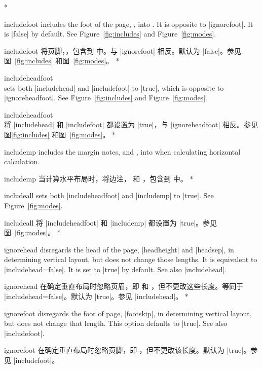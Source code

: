 \begin{Options}
\begin{paracol}{2}
\switchcolumn[0]*
\item[includefoot] includes the foot of the page, ,
   into . It is opposite to |ignorefoot|.
   It is |false| by default. See Figure~\ref{fig:includes} and
   Figure~\ref{fig:modes}.
   \switchcolumn
   \item[includefoot] 将页脚，，包含到  中。与 |ignorefoot| 相反。默认为 |false|。参见图~\ref{fig:includes} 和图~\ref{fig:modes}。
   \switchcolumn[0]*
\item[includeheadfoot]~\\ 
   sets both |includehead| and |includefoot| to |true|, which is opposite
   to |ignoreheadfoot|. See Figure~\ref{fig:includes} and
   Figure~\ref{fig:modes}.
\switchcolumn
\item[includeheadfoot]~\\ 
将 |includehead| 和 |includefoot| 都设置为 |true|，与 |ignoreheadfoot| 相反。参见图\ref{fig:includes} 和图~\ref{fig:modes}。
\switchcolumn[0]*
\item[includemp] includes the margin notes,  
   and , into  when calculating horizontal
   calculation.
   \switchcolumn
   \item[includemp] 当计算水平布局时，将边注， 和 ，包含到  中。
\switchcolumn[0]*
\item[includeall] sets both |includeheadfoot| and |includemp| to
   |true|. See Figure~\ref{fig:modes}.
   \switchcolumn
   \item[includeall] 将 |includeheadfoot| 和 |includemp| 都设置为 |true|。参见图~\ref{fig:modes}。
\switchcolumn[0]*
\item[ignorehead] disregards the head of the page,
   |headheight| and |headsep|, in determining vertical layout, but does not
   change those lengths. It is equivalent to |includehead=false|. It is set
   to |true| by default. See also |includehead|.
   \switchcolumn
   \item[ignorehead] 在确定垂直布局时忽略页眉，即  和 ，但不更改这些长度。等同于 |includehead=false|。默认为 |true|。参见 |includehead|。
\switchcolumn[0]*
\item[ignorefoot] disregards the foot of page, |footskip|,
   in determining vertical layout, but does not change that length.
   This option defaults to |true|. See also |includefoot|.
   \switchcolumn
   \item[ignorefoot] 在确定垂直布局时忽略页脚，即 ，但不更改该长度。默认为 |true|。参见 |includefoot|。

\end{paracol}
\end{Options}
